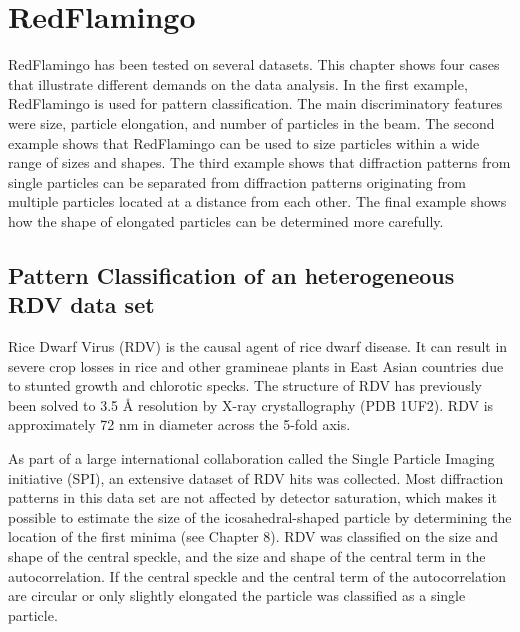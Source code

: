\section{RedFlamingo}

RedFlamingo has been tested on several datasets. This chapter shows four cases that illustrate different demands on the data analysis. In the first example, RedFlamingo is used for pattern classification. The main discriminatory features were size, particle elongation, and number of particles in the beam. The second example shows that RedFlamingo can be used to size particles within a wide range of sizes and shapes. The third example shows that diffraction patterns from single particles can be separated from diffraction patterns originating from multiple particles located at a distance from each other. The final example shows how the shape of elongated particles can be determined more carefully. 

\subsection{Pattern Classification of an heterogeneous RDV data set}
Rice Dwarf Virus (RDV) is the causal agent of rice dwarf disease. It can result in severe crop losses in rice and other gramineae plants in East Asian countries due to stunted growth and chlorotic specks. The structure of RDV has previously been solved to 3.5 {\AA} resolution by X-ray crystallography \cite{Nakagawa2003} (PDB 1UF2). RDV is approximately 72 nm in diameter across the 5-fold axis.

As part of a large international collaboration called the Single Particle Imaging initiative (SPI)\cite{Aquila2015a}, an extensive dataset of RDV hits was collected. Most diffraction patterns in this data set are not affected by detector saturation, which makes it possible to estimate the size of the icosahedral-shaped particle by determining the location of the first minima (see Chapter 8).
RDV was classified on the size and shape of the central speckle, and the size and shape of the central term in the autocorrelation. If the central speckle and the central term of the autocorrelation are circular or only slightly elongated the particle was classified as a single particle.  

